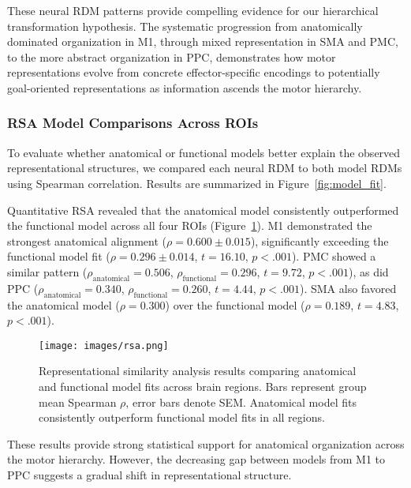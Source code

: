 \documentclass{article}
\begin{document}
These neural RDM patterns provide compelling evidence for our hierarchical transformation hypothesis. The systematic progression from anatomically dominated organization in M1, through mixed representation in SMA and PMC, to the more abstract organization in PPC, demonstrates how motor representations evolve from concrete effector-specific encodings to potentially goal-oriented representations as information ascends the motor hierarchy.

\subsubsection{RSA Model Comparisons Across ROIs}
To evaluate whether anatomical or functional models better explain the observed representational structures, we compared each neural RDM to both model RDMs using Spearman correlation. Results are summarized in Figure~\ref{fig:model_fit}.

Quantitative RSA revealed that the anatomical model consistently outperformed the functional model across all four ROIs (Figure~\ref{fig:rsa}). M1 demonstrated the strongest anatomical alignment (\(\rho = 0.600 \pm 0.015\)), significantly exceeding the functional model fit (\(\rho = 0.296 \pm 0.014\), \(t = 16.10\), \(p < .001\)). PMC showed a similar pattern (\(\rho_{\text{anatomical}} = 0.506\), \(\rho_{\text{functional}} = 0.296\), \(t = 9.72\), \(p < .001\)), as did PPC (\(\rho_{\text{anatomical}} = 0.340\), \(\rho_{\text{functional}} = 0.260\), \(t = 4.44\), \(p < .001\)). SMA also favored the anatomical model (\(\rho = 0.300\)) over the functional model (\(\rho = 0.189\), \(t = 4.83\), \(p < .001\)).

\begin{figure}[!htbp]
\centering
\texttt{[image: images/rsa.png]}
\caption{Representational similarity analysis results comparing anatomical and functional model fits across brain regions. Bars represent group mean Spearman \(\rho\), error bars denote SEM. Anatomical model fits consistently outperform functional model fits in all regions.}
\label{fig:rsa}
\end{figure}

These results provide strong statistical support for anatomical organization across the motor hierarchy. However, the decreasing gap between models from M1 to PPC suggests a gradual shift in representational structure.


\end{document}
